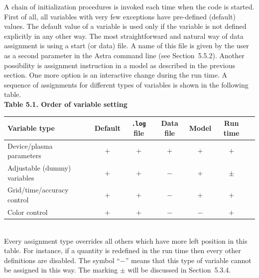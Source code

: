A chain of initialization procedures is invoked each time when the code
is started.
First of all, all variables with very few exceptions have pre-defined
(default) values. 
The default value of a variable is used only if the variable is not
defined explicitly in any other way. 
The most straightforward and natural way of data assignment is using a
start (or data) file. 
A name of this file is given by the user as a second parameter in the 
Astra command line (see Section~5.5.2).
Another possibility is assignment instruction in a model as 
described in the previous section.
One more option is an interactive change during the run time.
A sequence of assignments for different types of variables is shown in
the following table. 
\medskip\\
\indent
{\bf Table 5.1. Order of variable setting}
\nopagebreak
\\[10pt]
\nopagebreak
\noindent
\begin{tabular}{| l | c | c | c | c | c | c |}			\hline
\bf Variable type	&\bf Default	&\bf{\tt .log }file
					&\bf Data file
						&\bf Model
							&\bf Run time \\ 
								\hline
Device/plasma parameters	& $+$	& $+$	& $+$	& $+$	& $+$ \\
Adjustable (dummy) variables	& $+$	& $+$	& $-$	& $+$	& $\pm$\\
Grid/time/accuracy control	& $+$	& $+$	& $-$	& $+$	& $+$ \\
Color control			& $+$	& $+$	& $-$	& $-$	& $+$ \\ 
								\hline
\end{tabular}
\\[10pt]
Every assignment type overrides all others which have 
more left position in this table.
For instance, if a quantity is redefined in the run time then every
other definitions are disabled.
The symbol ``$-$'' means that this type of variable cannot be assigned 
in this way.
The marking $\pm$ will be discussed in Section~5.3.4.

